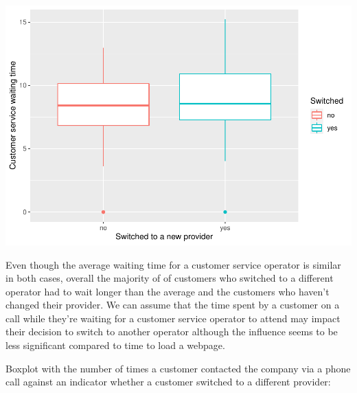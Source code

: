 \documentclass[
]{article}
\newenvironment{Shaded}{\begin{snugshade}}{\end{snugshade}}
\newcommand{\DataTypeTok}[1]{\textcolor[rgb]{0.13,0.29,0.53}{#1}}
\newcommand{\KeywordTok}[1]{\textcolor[rgb]{0.13,0.29,0.53}{\textbf{#1}}}
\newcommand{\NormalTok}[1]{#1}
\newcommand{\OperatorTok}[1]{\textcolor[rgb]{0.81,0.36,0.00}{\textbf{#1}}}
\newcommand{\StringTok}[1]{\textcolor[rgb]{0.31,0.60,0.02}{#1}}
\begin{document}
\begin{Shaded}
\end{Shaded}

\includegraphics{Report_files/figure-latex/unnamed-chunk-4-1.pdf}

Even though the average waiting time for a customer service operator is
similar in both cases, overall the majority of of customers who switched
to a different operator had to wait longer than the average and the
customers who haven't changed their provider. We can assume that the
time spent by a customer on a call while they're waiting for a customer
service operator to attend may impact their decision to switch to
another operator although the influence seems to be less significant
compared to time to load a webpage.

Boxplot with the number of times a customer contacted the company via a
phone call against an indicator whether a customer switched to a
different provider:
\end{document}
